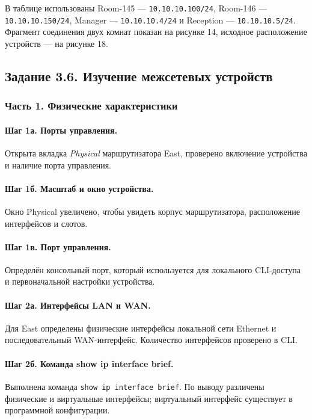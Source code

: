 \documentclass[a4paper,14pt,oneside]{extarticle}
\begin{document}
В таблице использованы Room-145 --- \texttt{10.10.10.100/24}, Room-146 ---
\texttt{10.10.10.150/24}, Manager --- \texttt{10.10.10.4/24} и Reception ---
\texttt{10.10.10.5/24}. Фрагмент соединения двух комнат показан на рисунке
14, исходное расположение устройств --- на рисунке 18.

\subsection{Задание 3.6. Изучение межсетевых устройств}

\subsubsection{Часть 1. Физические характеристики}

\paragraph{Шаг 1а. Порты управления.}
Открыта вкладка \textit{Physical} маршрутизатора East, проверено включение
устройства и наличие порта управления.

\paragraph{Шаг 1б. Масштаб и окно устройства.}
Окно Physical увеличено, чтобы увидеть корпус маршрутизатора, расположение
интерфейсов и слотов.

\paragraph{Шаг 1в. Порт управления.}
Определён консольный порт, который используется для локального CLI-доступа
и первоначальной настройки устройства.

\paragraph{Шаг 2а. Интерфейсы LAN и WAN.}
Для East определены физические интерфейсы локальной сети Ethernet и
последовательный WAN-интерфейс. Количество интерфейсов проверено в CLI.

\paragraph{Шаг 2б. Команда show ip interface brief.}
Выполнена команда \texttt{show ip interface brief}. По выводу различены
физические и виртуальные интерфейсы; виртуальный интерфейс существует в
программной конфигурации.
\end{document}
